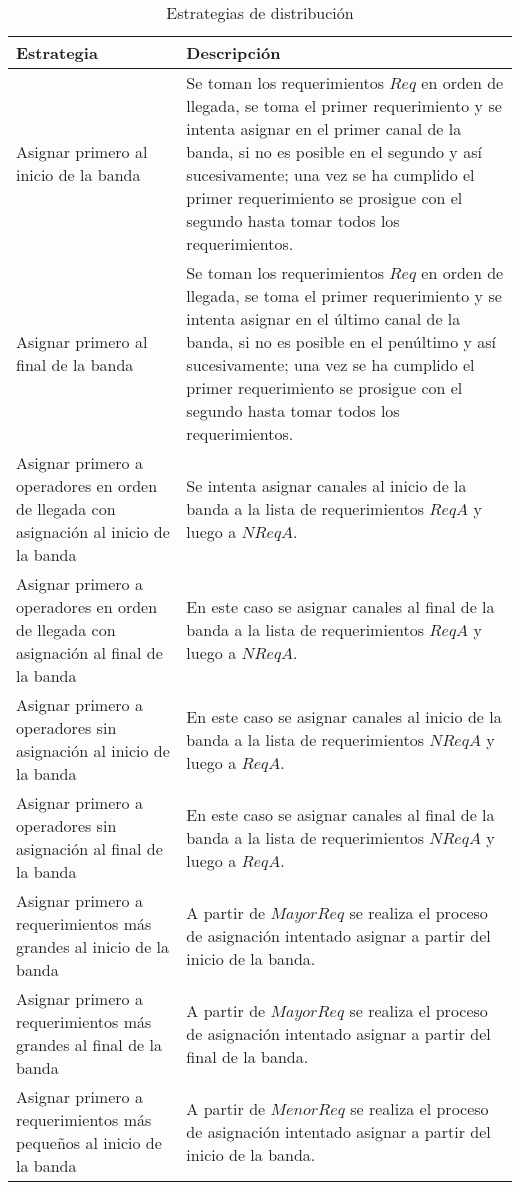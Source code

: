 \begin{center}
\begin{longtable}{|p{3cm}|p{13.5cm}|}
	\caption{Estrategias de distribución} \label{table:esDistribucion}\\
	\hline
	\cellcolor[gray]{0.9} \textbf{Estrategia} & \cellcolor[gray]{0.9}\textbf{Descripción} \\
	\hline
	Asignar primero al inicio de la banda & Se toman los requerimientos $Req$ en orden de llegada, se toma el primer requerimiento y se intenta asignar en el primer canal de la banda, si no es posible en el segundo y así sucesivamente; una vez se ha cumplido el primer requerimiento se prosigue con el segundo hasta tomar todos los requerimientos.\\
	\hline
	Asignar primero al final de la banda & Se toman los requerimientos $Req$ en orden de llegada, se toma el primer requerimiento y se intenta asignar en el último canal de la banda, si no es posible en el penúltimo y así sucesivamente; una vez se ha cumplido el primer requerimiento se prosigue con el segundo hasta tomar todos los requerimientos.\\
	\hline
	Asignar primero a operadores en orden de llegada con asignación al inicio de la banda &  Se intenta asignar canales al inicio de la banda a la lista de requerimientos $ReqA$ y luego a $NReqA$.\\
	\hline
	Asignar primero a operadores en orden de llegada con asignación al final de la banda &  En este caso se asignar canales al final de la banda a la lista de requerimientos $ReqA$ y luego a $NReqA$.\\
	\hline
	Asignar primero a operadores sin asignación al inicio de la banda & En este caso se asignar canales al inicio de la banda a la lista de requerimientos $NReqA$ y luego a $ReqA$.\\
	\hline
	Asignar primero a operadores sin asignación al final de la banda & En este caso se asignar canales al final de la banda a la lista de requerimientos $NReqA$ y luego a $ReqA$.\\
	\hline
	Asignar primero a requerimientos más grandes al inicio de la banda & A partir de $MayorReq$ se realiza el proceso de asignación intentado asignar a partir del inicio de la banda.\\
	\hline
	Asignar primero a requerimientos más grandes al final de la banda & A partir de $MayorReq$ se realiza el proceso de asignación intentado asignar a partir del final de la banda.\\
	\hline
	Asignar primero a requerimientos más pequeños al inicio de la banda & A partir de $MenorReq$ se realiza el proceso de asignación intentado asignar a partir del inicio de la banda.\\

\end{longtable}
\end{center}
